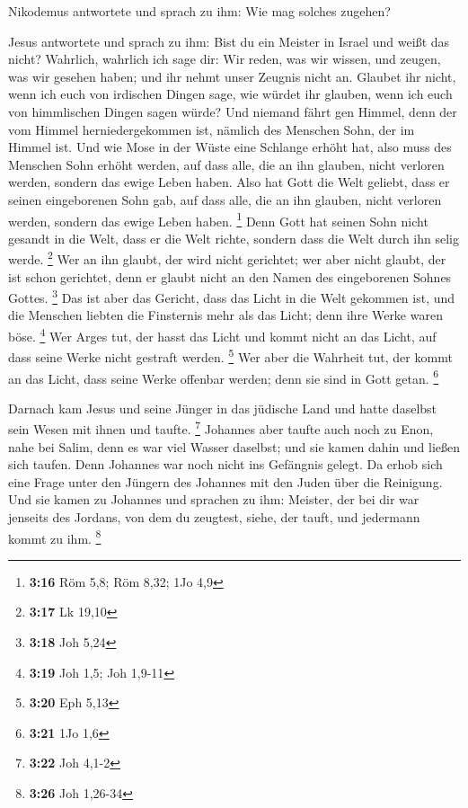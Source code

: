  Nikodemus antwortete und sprach zu ihm: Wie mag solches
zugehen?

 Jesus antwortete und sprach zu ihm: Bist du ein Meister in
Israel und weißt das nicht?  Wahrlich, wahrlich ich sage
dir: Wir reden, was wir wissen, und zeugen, was wir gesehen haben; und
ihr nehmt unser Zeugnis nicht an.  Glaubet ihr nicht, wenn
ich euch von irdischen Dingen sage, wie würdet ihr glauben, wenn ich
euch von himmlischen Dingen sagen würde?  Und niemand fährt
gen Himmel, denn der vom Himmel herniedergekommen ist, nämlich des
Menschen Sohn, der im Himmel ist.  Und wie Mose in der
Wüste eine Schlange erhöht hat, also muss des Menschen Sohn erhöht
werden,  auf dass alle, die an ihn glauben, nicht verloren
werden, sondern das ewige Leben haben.  Also hat Gott die
Welt geliebt, dass er seinen eingeborenen Sohn gab, auf dass alle, die
an ihn glauben, nicht verloren werden, sondern das ewige Leben haben.
\footnote{\textbf{3:16} Röm 5,8; Röm 8,32; 1Jo 4,9}  Denn
Gott hat seinen Sohn nicht gesandt in die Welt, dass er die Welt richte,
sondern dass die Welt durch ihn selig werde. \footnote{\textbf{3:17} Lk
  19,10}  Wer an ihn glaubt, der wird nicht gerichtet; wer
aber nicht glaubt, der ist schon gerichtet, denn er glaubt nicht an den
Namen des eingeborenen Sohnes Gottes. \footnote{\textbf{3:18} Joh 5,24}
 Das ist aber das Gericht, dass das Licht in die Welt
gekommen ist, und die Menschen liebten die Finsternis mehr als das
Licht; denn ihre Werke waren böse. \footnote{\textbf{3:19} Joh 1,5; Joh
  1,9-11}  Wer Arges tut, der hasst das Licht und kommt
nicht an das Licht, auf dass seine Werke nicht gestraft werden.
\footnote{\textbf{3:20} Eph 5,13}  Wer aber die Wahrheit
tut, der kommt an das Licht, dass seine Werke offenbar werden; denn sie
sind in Gott getan. \footnote{\textbf{3:21} 1Jo 1,6}

 Darnach kam Jesus und seine Jünger in das jüdische Land
und hatte daselbst sein Wesen mit ihnen und taufte. \footnote{\textbf{3:22}
  Joh 4,1-2}  Johannes aber taufte auch noch zu Enon, nahe
bei Salim, denn es war viel Wasser daselbst; und sie kamen dahin und
ließen sich taufen.  Denn Johannes war noch nicht ins
Gefängnis gelegt.  Da erhob sich eine Frage unter den
Jüngern des Johannes mit den Juden über die Reinigung.  Und
sie kamen zu Johannes und sprachen zu ihm: Meister, der bei dir war
jenseits des Jordans, von dem du zeugtest, siehe, der tauft, und
jedermann kommt zu ihm. \footnote{\textbf{3:26} Joh 1,26-34}

